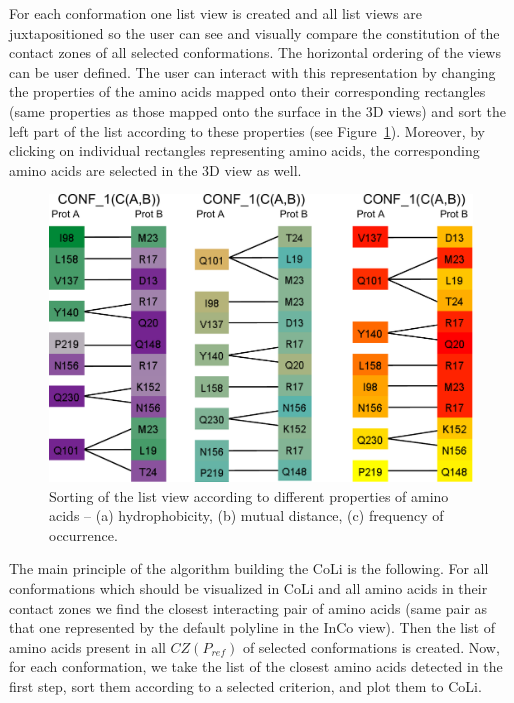 \documentclass[journal]{vgtc}                %
\begin{document}
For each conformation one list view is created and all list views are juxtapositioned so the user can see and visually compare the constitution of the contact zones of all selected conformations.
The horizontal ordering of the views can be user defined.
The user can interact with this representation by changing the properties of the amino acids mapped onto their corresponding rectangles (same properties as those mapped onto the surface in the 3D views) and sort the left part of the list according to these properties (see Figure~\ref{fig:sorting}).
Moreover, by clicking on individual rectangles representing amino acids, the corresponding amino acids are selected in the 3D view as well.

\begin{figure}[bt]
  \centering
  \includegraphics[width=1.0\columnwidth]{sorting.pdf}
  \caption{Sorting of the list view according to different properties of amino acids -- (a) hydrophobicity, (b) mutual distance, (c) frequency of occurrence.}
  \label{fig:sorting}
\end{figure}

The main principle of the algorithm building the CoLi is the following.
For all conformations which should be visualized in CoLi and all amino acids in their contact zones we find the closest interacting pair of amino acids (same pair as that one represented by the default polyline in the InCo view).
Then the list of amino acids present in all $CZ(P_{ref})$ of selected conformations is created.
Now, for each conformation, we take the list of the closest amino acids detected in the first step, sort them according to a selected criterion, and plot them to CoLi.
\end{document}
